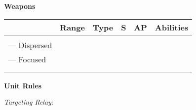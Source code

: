 \begin{minipage}[t]{0.72\textwidth}
	
	\vspace*{2em}
	\textbf{Weapons}
	
	\begin{tabular}{m{95 pt} *{4}{c} >{\raggedright\arraybackslash}p{130pt}}
		& Range & Type & S & AP & Abilities \\
		\hline
		\quickref{Heat Ray} &  &  & &  &  \\
		— Dispersed &  &  & &  &  \\
		— Focused &  &  & &  &  \\
		\quickref{Particle Shredder} \\
		\quickref{Heavy Gauss Cannon}
	\end{tabular}
	
	\vspace*{2em}
	\textbf{Unit Rules}
	
	\textit{Targeting Relay}: 
\end{minipage}
